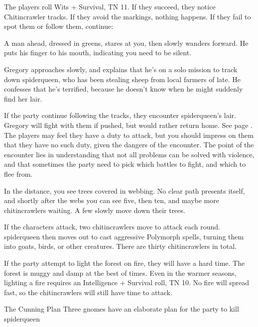 \begin{multicols}{2}
The players roll Wits + Survival, TN 11.  If they succeed, they notice Chitincrawler tracks.  If they avoid the markings, nothing happens.  If they fail to spot them or follow them, continue:

\begin{boxtext}

	A man ahead, dressed in greens, stares at you, then slowly wanders forward.  He puts his finger to his mouth, indicating you need to be silent.

\end{boxtext}

Gregory approaches slowly, and explains that he's on a solo mission to track down \gls{spiderqueen}, who has been stealing sheep from local farmers of late.
He confesses that he's terrified, because he doesn't know when he might suddenly find her lair.

If the party continue following the tracks, they encounter \gls{spiderqueen}'s lair.
Gregory will fight with them if pushed, but would rather return home.
See page \pageref{spiderqueen}.
The players may feel they have a duty to attack, but you should impress on them that they have no such duty, given the dangers of the encounter.
The point of the encounter lies in understanding that not all problems can be solved with violence, and that sometimes the party need to pick which battles to fight, and which to flee from.

\begin{boxtext}
	In the distance, you see trees covered in webbing.  No clear path presents itself, and shortly after the webs you can see five, then ten, and maybe more chitincrawlers waiting.  A few slowly move down their trees.
\end{boxtext}

If the characters attack, two chitincrawlers move to attack each round.
\Gls{spiderqueen} then moves out to cast aggressive Polymorph spells, turning them into goats, birds, or other creatures.
There are thirty chitincrawlers in total.

If the party attempt to light the forest on fire, they will have a hard time.
The forest is muggy and damp at the best of times.
Even in the warmer seasons, lighting a fire requires an Intelligence + Survival roll, TN 10.
No fire will spread fast, so the chitincrawlers will still have time to attack.


{The Cunning Plan}%
{Three gnomes have an elaborate plan for the party to kill \gls{spiderqueen}}%


\end{multicols}
